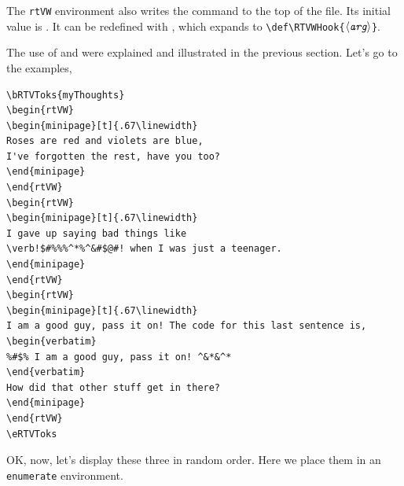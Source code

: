 \documentclass{article}
\let\env\texttt
\def\anglemeta#1{$\langle\textit{\texttt{#1}}\rangle$}
\let\ameta\anglemeta
\def\darg#1{\texttt{\{#1\}}}
\let\amtIndent\leftmargini
\begin{document}
The \env{rtVW} environment also writes the command
 to the top of
the file. Its initial value is . It can be redefined with
\cs{rtVWHook\darg{\ameta{arg}}}, which expands to
\verb|\def\RTVWHook{|\ameta{arg}\verb|}|.

The use of  and  were explained and illustrated
in the previous section. Let's go to the examples,
\begin{Verbatim}[xleftmargin=\amtIndent]
\bRTVToks{myThoughts}
\begin{rtVW}
\begin{minipage}[t]{.67\linewidth}
Roses are red and violets are blue,
I've forgotten the rest, have you too?
\end{minipage}
\end{rtVW}
\begin{rtVW}
\begin{minipage}[t]{.67\linewidth}
I gave up saying bad things like
\verb!$#%%%^*%^&#$@#! when I was just a teenager.
\end{minipage}
\end{rtVW}
\begin{rtVW}
\begin{minipage}[t]{.67\linewidth}
I am a good guy, pass it on! The code for this last sentence is,
\begin{verbatim}
%#$% I am a good guy, pass it on! ^&*&^*
\end{verbatim}
How did that other stuff get in there?
\end{minipage}
\end{rtVW}
\eRTVToks
\end{Verbatim}
OK, now, let's display these three in random order. Here we place them in
an \texttt{enumerate} environment.
\end{document}
